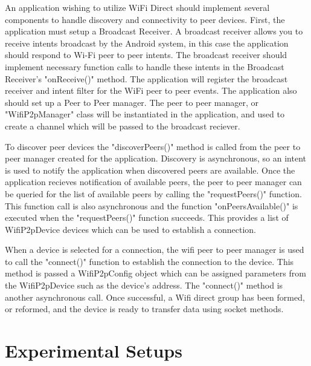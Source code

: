 \documentclass[10pt,twocolumn]{article}
\begin{document}
An application wishing to utilize WiFi Direct should implement several components to handle discovery and connectivity to peer devices.
First, the application must setup a Broadcast Receiver. 
A broadcast receiver allows you to receive intents broadcast by the Android system, in this case the application should respond to Wi-Fi peer to peer intents.
The broadcast receiver should implement necessary function calls to handle these intents in the Broadcast Receiver's "onReceive()" method.
The application will register the broadcast receiver and intent filter for the WiFi peer to peer events.
The application also should set up a Peer to Peer manager. 
The peer to peer manager, or "WifiP2pManager" class will be instantiated in the application, and used to create a channel which will be passed to the broadcast reciever.

To discover peer devices the "discoverPeers()" method is called from the peer to peer manager created for the application.
Discovery is asynchronous, so an intent is used to notify the application when discovered peers are available.
Once the application recieves notification of available peers, the peer to peer manager can be queried for the list of available peers by calling the "requestPeers()" function. 
This function call is also asynchronous and the function "onPeersAvailable()" is executed when the "requestPeers()" function succeeds. 
This provides a list of WifiP2pDevice devices which can be used to establish a connection. \cite{androidp2p}

When a device is selected for a connection, the wifi peer to peer manager is used to call the "connect()" function to establish the connection to the device. 
This method is passed a WifiP2pConfig object which can be assigned parameters from the WifiP2pDevice such as the device's address.
The "connect()" method is another asynchronous call. 
Once successful, a Wifi direct group has been formed, or reformed, and the device is ready to transfer data using socket methods.

\section{Experimental Setups}
\end{document}
